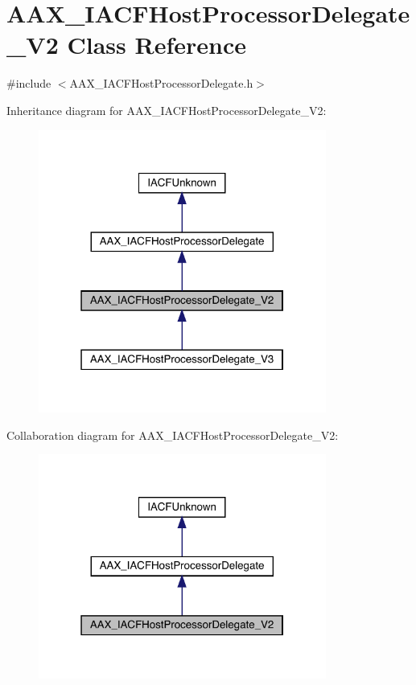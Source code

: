 \hypertarget{a01705}{}\section{A\+A\+X\+\_\+\+I\+A\+C\+F\+Host\+Processor\+Delegate\+\_\+\+V2 Class Reference}
\label{a01705}


{\ttfamily \#include $<$A\+A\+X\+\_\+\+I\+A\+C\+F\+Host\+Processor\+Delegate.\+h$>$}



Inheritance diagram for A\+A\+X\+\_\+\+I\+A\+C\+F\+Host\+Processor\+Delegate\+\_\+\+V2\+:
\nopagebreak
\begin{figure}[H]
\begin{center}
\leavevmode
\includegraphics[width=268pt]{a01704}
\end{center}
\end{figure}


Collaboration diagram for A\+A\+X\+\_\+\+I\+A\+C\+F\+Host\+Processor\+Delegate\+\_\+\+V2\+:
\nopagebreak
\begin{figure}[H]
\begin{center}
\leavevmode
\includegraphics[width=268pt]{a01703}
\end{center}
\end{figure}


